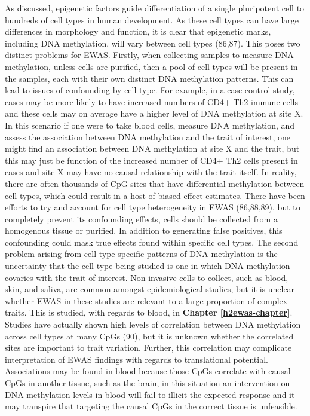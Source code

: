 \documentclass[11pt,twoside]{bristolthesis}
\begin{document}
As discussed, epigenetic factors guide differentiation of a single pluripotent cell to hundreds of cell types in human development. As these cell types can have large differences in morphology and function, it is clear that epigenetic marks, including DNA methylation, will vary between cell types (86,87). This poses two distinct problems for EWAS. Firstly, when collecting samples to measure DNA methylation, unless cells are purified, then a pool of cell types will be present in the samples, each with their own distinct DNA methylation patterns. This can lead to issues of confounding by cell type. For example, in a case control study, cases may be more likely to have increased numbers of CD4+ Th2 immune cells and these cells may on average have a higher level of DNA methylation at site X. In this scenario if one were to take blood cells, measure DNA methylation, and assess the association between DNA methylation and the trait of interest, one might find an association between DNA methylation at site X and the trait, but this may just be function of the increased number of CD4+ Th2 cells present in cases and site X may have no causal relationship with the trait itself. In reality, there are often thousands of CpG sites that have differential methylation between cell types, which could result in a host of biased effect estimates. There have been efforts to try and account for cell type heterogeneity in EWAS (86,88,89), but to completely prevent its confounding effects, cells should be collected from a homogenous tissue or purified. In addition to generating false positives, this confounding could mask true effects found within specific cell types. The second problem arising from cell-type specific patterns of DNA methylation is the uncertainty that the cell type being studied is one in which DNA methylation covaries with the trait of interest. Non-invasive cells to collect, such as blood, skin, and saliva, are common amongst epidemiological studies, but it is unclear whether EWAS in these studies are relevant to a large proportion of complex traits. This is studied, with regards to blood, in \textbf{Chapter \ref{h2ewas-chapter}}. Studies have actually shown high levels of correlation between DNA methylation across cell types at many CpGs (90), but it is unknown whether the correlated sites are important to trait variation. Further, this correlation may complicate interpretation of EWAS findings with regards to translational potential. Associations may be found in blood because those CpGs correlate with causal CpGs in another tissue, such as the brain, in this situation an intervention on DNA methylation levels in blood will fail to illicit the expected response and it may transpire that targeting the causal CpGs in the correct tissue is unfeasible.
\end{document}
